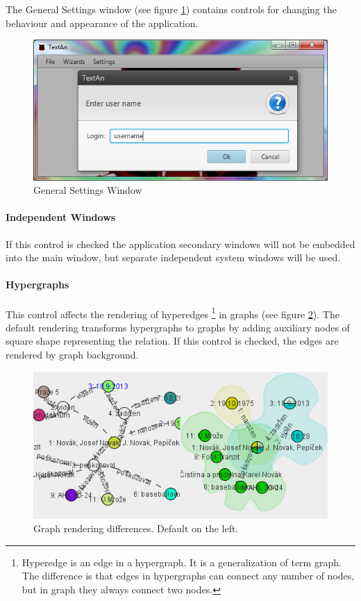 \documentclass[12pt,a4paper]{report}
\begin{document}
The General Settings window (see figure \ref{fig:GeneralSettings}) contains
controls for changing the behaviour and appearance of the application.

\begin{figure}[!htb]
        \centering
        \includegraphics[width=\textwidth]{Images/general}
        \caption{General Settings Window}
        \label{fig:GeneralSettings}
\end{figure}

\paragraph{Independent Windows} If this control is checked the application
secondary windows will not be embedded into the main window, but separate
independent system windows will be used.

\paragraph{Hypergraphs} This control affects the rendering of hyperedges%
\footnote{Hyperedge is an edge in a hypergraph. It is a generalization of
term graph. The difference is that edges in hypergraphs can connect any number
of nodes, but in graph they always connect two nodes.}
in graphs (see figure \ref{fig:Hypergraphs}). The default rendering transforms
hypergraphs to graphs by adding auxiliary nodes of square shape representing
the relation. If this control is checked, the edges are rendered by graph
background.

\begin{figure}[!htb]
        \centering
        \includegraphics[width=\textwidth]{Images/hypergraphs}
        \caption{Graph rendering differences. Default on the left.}
        \label{fig:Hypergraphs}
\end{figure}
\end{document}
